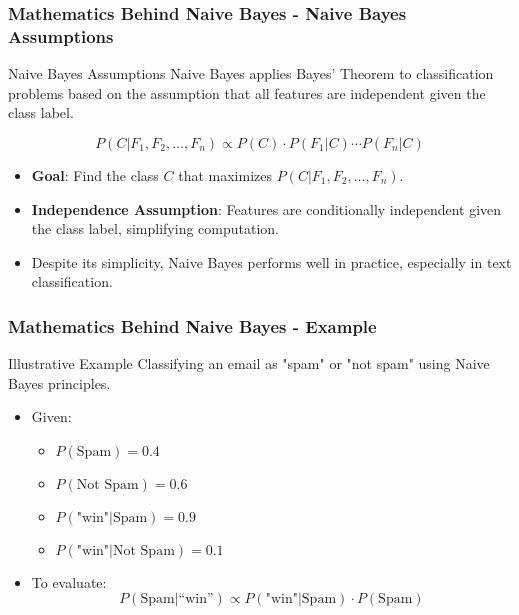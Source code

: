 \documentclass[aspectratio=169]{beamer}
\begin{document}
\begin{frame}[fragile]
    \frametitle{Mathematics Behind Naive Bayes - Naive Bayes Assumptions}
    \begin{block}{Naive Bayes Assumptions}
        Naive Bayes applies Bayes' Theorem to classification problems based on the assumption that all features are independent given the class label.
    \end{block}
    
    \begin{equation}
    P(C|F_1, F_2, \ldots, F_n) \propto P(C) \cdot P(F_1|C) \cdots P(F_n|C)
    \end{equation}

    \begin{itemize}
        \item \textbf{Goal}: Find the class \( C \) that maximizes \( P(C|F_1, F_2, \ldots, F_n) \).
        \item \textbf{Independence Assumption}: Features are conditionally independent given the class label, simplifying computation.
        \item Despite its simplicity, Naive Bayes performs well in practice, especially in text classification.
    \end{itemize}
\end{frame}

\begin{frame}[fragile]
    \frametitle{Mathematics Behind Naive Bayes - Example}
    \begin{block}{Illustrative Example}
        Classifying an email as "spam" or "not spam" using Naive Bayes principles.
    \end{block}
    
    \begin{itemize}
        \item Given:
        \begin{itemize}
            \item \( P(\text{Spam}) = 0.4 \)
            \item \( P(\text{Not Spam}) = 0.6 \)
            \item \( P(\text{"win"|Spam}) = 0.9 \)
            \item \( P(\text{"win"|Not Spam}) = 0.1 \)
        \end{itemize}
        \item To evaluate:
        \begin{equation}
        P(\text{Spam|“win”}) \propto P(\text{"win"|Spam}) \cdot P(\text{Spam}) 
        \end{equation}
    \end{itemize}
\end{frame}
\end{document}
